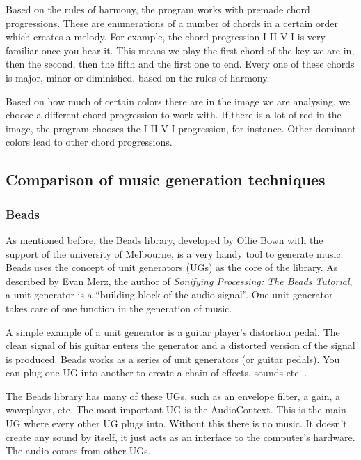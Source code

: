 \documentclass[12pt]{article}
\begin{document}
Based on the rules of harmony, the program works with premade chord progressions. These are enumerations of a number of chords in a certain order which creates a melody. For example, the chord progression I-II-V-I is very familiar once you hear it. This means we play the first chord of the key we are in, then the second, then the fifth and the first one to end. Every one of these chords is major,  minor or diminished, based on the rules of harmony.
\newline

Based on how much of certain colors there are in the image we are analysing, we choose a different chord progression to work with. If there is a lot of red in the image, the program chooses the I-II-V-I progression, for instance. Other dominant colors lead to other chord progressions.

\subsection{Comparison of music generation techniques}

\subsubsection{Beads}
As mentioned before, the Beads library, developed by Ollie Bown with the support of the university of Melbourne, is a very handy tool to generate music. Beads uses the concept of unit generators (UGs) as the core of the library. As described by Evan Merz, the author of \textit{Sonifying Processing: The Beads Tutorial}, a unit generator is a ``building block of the audio signal''.  One unit generator takes care of one function in the generation of music. 
\newline

A simple example of a unit generator is a guitar player's distortion pedal. The clean signal of his guitar enters the generator and a distorted version of the signal is produced. Beads works as a series of unit generators (or guitar pedals). You can plug one UG into another to create a chain of effects, sounds etc... 
\newline

The Beads library has many of these UGs, such as an envelope filter, a gain, a waveplayer, etc. The most important UG is the AudioContext. This is the main UG where every other UG plugs into. Without this there is no music. It doesn't create any sound by itself, it just acts as an interface to the computer's hardware. The audio comes from other UGs.
\newline
\end{document}

